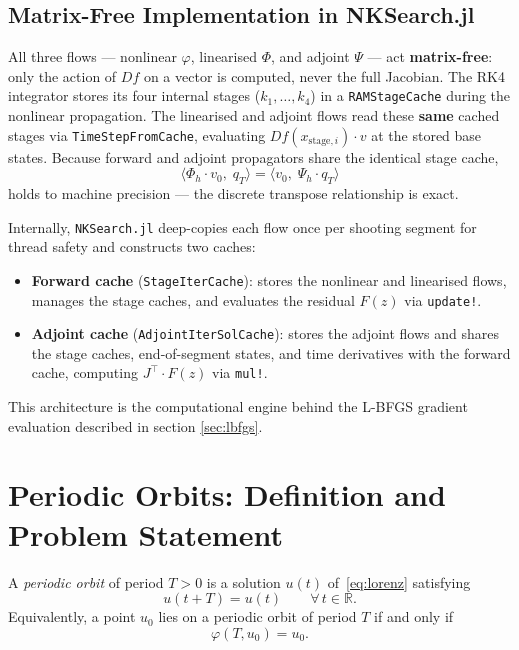 \documentclass[11pt,a4paper]{article}
\begin{document}
\subsection{Matrix-Free Implementation in NKSearch.jl}\label{sec:prelim_impl}
All three flows --- nonlinear $\varphi$, linearised $\Phi$, and adjoint
$\Psi$ --- act \textbf{matrix-free}: only the action of $Df$ on a vector is
computed, never the full Jacobian.  The RK4 integrator stores its four
internal stages ($k_1, \dots, k_4$) in a \texttt{RAMStageCache} during the
nonlinear propagation.  The linearised and adjoint flows read these
\textbf{same} cached stages via \texttt{TimeStepFromCache}, evaluating
$Df(x_{\text{stage}, i}) \cdot v$ at the stored base states.  Because
forward and adjoint propagators share the identical stage cache,
\begin{equation}
  \langle \Phi_h \cdot v_0,\; q_T \rangle
  = \langle v_0,\; \Psi_h \cdot q_T \rangle
\end{equation}
holds to machine precision --- the discrete transpose relationship is exact.

Internally, \texttt{NKSearch.jl} deep-copies each flow once per shooting
segment for thread safety and constructs two caches:
\begin{itemize}
  \item \textbf{Forward cache} (\texttt{StageIterCache}): stores the
        nonlinear and linearised flows, manages the stage caches, and
        evaluates the residual $F(z)$ via \texttt{update!}.
  \item \textbf{Adjoint cache} (\texttt{AdjointIterSolCache}): stores the
        adjoint flows and shares the stage caches, end-of-segment states,
        and time derivatives with the forward cache, computing
        $J^\top \cdot F(z)$ via \texttt{mul!}.
\end{itemize}
This architecture is the computational engine behind the L-BFGS gradient
evaluation described in section \ref{sec:lbfgs}.

\section{Periodic Orbits: Definition and Problem Statement}

A \emph{periodic orbit} of period $T > 0$ is a solution
$u(t)$ of~\eqref{eq:lorenz} satisfying
\begin{equation}\label{eq:periodic}
  u(t + T) = u(t) \qquad \forall\, t \in \mathbb{R}.
\end{equation}
Equivalently, a point $u_0$ lies on a periodic orbit of period $T$
if and only if
\begin{equation}\label{eq:periodic_condition}
  \varphi(T, u_0) = u_0.
\end{equation}
\end{document}
